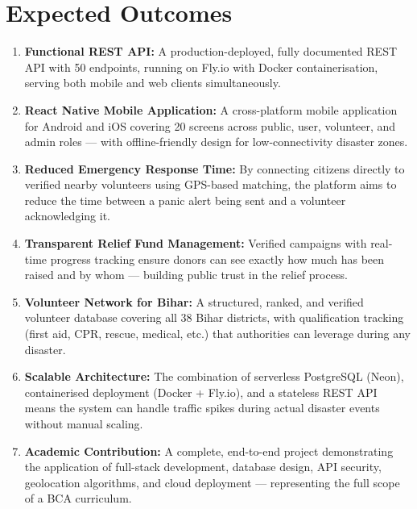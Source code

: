 \documentclass[12pt,a4paper]{article}
\begin{document}
\section{Expected Outcomes}

\begin{enumerate}[leftmargin=*, label=\textbf{\arabic*.}, itemsep=4pt]

  \item \textbf{Functional REST API:} A production-deployed, fully documented
        REST API with 50 endpoints, running on Fly.io with Docker containerisation,
        serving both mobile and web clients simultaneously.

  \item \textbf{React Native Mobile Application:} A cross-platform mobile
        application for Android and iOS covering 20 screens across public,
        user, volunteer, and admin roles --- with offline-friendly design
        for low-connectivity disaster zones.

  \item \textbf{Reduced Emergency Response Time:} By connecting citizens
        directly to verified nearby volunteers using GPS-based matching,
        the platform aims to reduce the time between a panic alert being
        sent and a volunteer acknowledging it.

  \item \textbf{Transparent Relief Fund Management:} Verified campaigns
        with real-time progress tracking ensure donors can see exactly
        how much has been raised and by whom --- building public trust
        in the relief process.

  \item \textbf{Volunteer Network for Bihar:} A structured, ranked, and
        verified volunteer database covering all 38 Bihar districts,
        with qualification tracking (first aid, CPR, rescue, medical, etc.)
        that authorities can leverage during any disaster.

  \item \textbf{Scalable Architecture:} The combination of serverless
        PostgreSQL (Neon), containerised deployment (Docker + Fly.io),
        and a stateless REST API means the system can handle traffic
        spikes during actual disaster events without manual scaling.

  \item \textbf{Academic Contribution:} A complete, end-to-end project
        demonstrating the application of full-stack development, database
        design, API security, geolocation algorithms, and cloud deployment
        --- representing the full scope of a BCA curriculum.

\end{enumerate}
\end{document}
